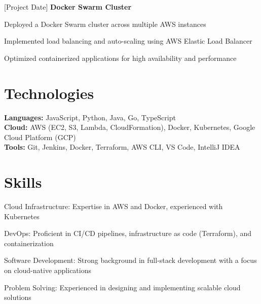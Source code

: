     \vspace{0.2 cm}

    \begin{twocolentry}{
        [Project Date]
    }
        \textbf{Docker Swarm Cluster}
    \end{twocolentry}

    \vspace{0.10 cm}
    \begin{onecolentry}
        \begin{highlights}
            \item Deployed a Docker Swarm cluster across multiple AWS instances
            \item Implemented load balancing and auto-scaling using AWS Elastic Load Balancer
            \item Optimized containerized applications for high availability and performance
        \end{highlights}
    \end{onecolentry}

    \section{Technologies}

    \begin{onecolentry}
        \textbf{Languages:} JavaScript, Python, Java, Go, TypeScript \\
        \textbf{Cloud:} AWS (EC2, S3, Lambda, CloudFormation), Docker, Kubernetes, Google Cloud Platform (GCP) \\
        \textbf{Tools:} Git, Jenkins, Docker, Terraform, AWS CLI, VS Code, IntelliJ IDEA
    \end{onecolentry}

    \section{Skills}

    \begin{onecolentry}
        \begin{highlights}
            \item Cloud Infrastructure: Expertise in AWS and Docker, experienced with Kubernetes
            \item DevOps: Proficient in CI/CD pipelines, infrastructure as code (Terraform), and containerization
            \item Software Development: Strong background in full-stack development with a focus on cloud-native applications
            \item Problem Solving: Experienced in designing and implementing scalable cloud solutions
        \end{highlights}
    \end{onecolentry}

